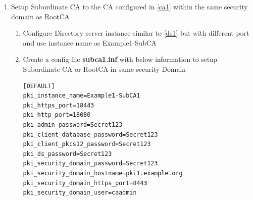 \documentclass[a4paper]{article}
\begin{document}
\begin{enumerate}[label*=\arabic*.]
\begin{enumerate}[label*=\arabic*.]
\begin{lstlisting}[style=configFile]
[slapd]
ServerIdentifier=pki-tomcat-RootCA
ServerPort=389
Suffix=dc=example,dc=org
RootDN=cn=Directory Manager
RootDNPwd=Secret123

[admin]
ServerAdminID=admin
ServerAdminPwd=Secret123
SysUser=nobody
                        \end{lstlisting}
                    \begin{lstlisting}[style=bashInputStyle]
$ setup-ds.pl --silent --file=ca-ds.inf --debug
                    \end{lstlisting}
                \item \label{ca1}Run \textbf{\textit{pkispawn}} in interactive mode use default ports and specify Directory
                    server information configured above. Use Tomcat Instance name as 'pki-tomcat'
                    \begin{lstlisting}
Subsystem (CA/KRA/OCSP/TKS/TPS) [CA]:

Tomcat:
  Instance [pki-tomcat]:
  HTTP port [8080]:
  Secure HTTP port [8443]:
  AJP port [8009]:
  Management port [8005]:

Administrator:
  Username [caadmin]:
  Password:
  Verify password:
  Import certificate (Yes/No) [N]?
  Export certificate to [/root/.dogtag/pki-tomcat/ca_admin.cert]:
Directory Server:
  Hostname [pki1.example.org]:
  Use a secure LDAPS connection (Yes/No/Quit) [N]?
  LDAP Port [389]:
  Bind DN [cn=Directory Manager]:
  Password:
  Base DN [o=pki-tomcat-CA]:

Security Domain:
  Name [example.org Security Domain]:

Begin installation (Yes/No/Quit)? Yes
                    \end{lstlisting}
            \end{enumerate}
        \item \label{ca2} Setup Subordinate CA to the CA configured in \ref{ca1} within the same security domain as RootCA
            \begin{enumerate}[label*=\arabic*.]
                \item Configure Directory server instance similar to \ref{ds1} but with different port and use instance name as Example1-SubCA
                \item Create a config file \textbf{subca1.inf} with below information to setup Subordinate CA or RootCA in same security Domain
                    \begin{lstlisting}[style=configFile]
[DEFAULT]
pki_instance_name=Example1-SubCA1
pki_https_port=18443
pki_http_port=18080
pki_admin_password=Secret123
pki_client_database_password=Secret123
pki_client_pkcs12_password=Secret123
pki_ds_password=Secret123
pki_security_domain_password=Secret123
pki_security_domain_hostname=pki1.example.org
pki_security_domain_https_port=8443
pki_security_domain_user=caadmin


\end{lstlisting}
\end{enumerate}
\end{enumerate}
\end{document}
